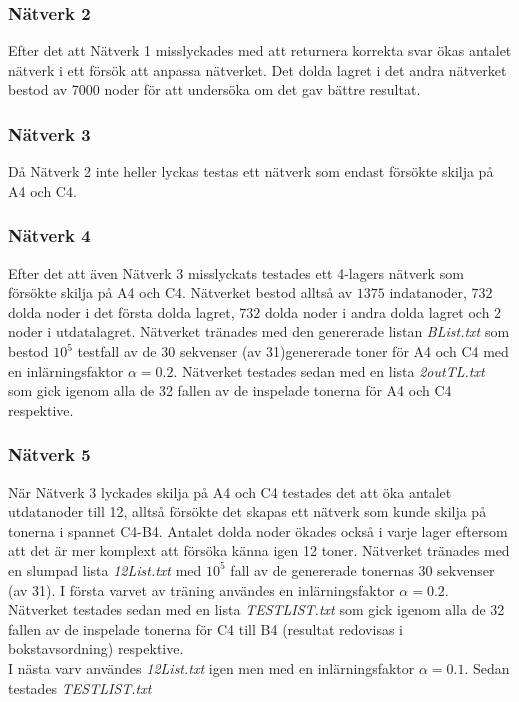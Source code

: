 \documentclass[a4paper,10pt]{article}
\begin{document}
\subsubsection{Nätverk 2}
Efter det att Nätverk 1 misslyckades med att returnera korrekta svar ökas antalet nätverk i ett försök att anpassa nätverket. Det dolda lagret i det andra nätverket bestod av 7000 noder för att undersöka om det gav bättre resultat. 
\subsubsection{Nätverk 3}
Då Nätverk 2 inte heller lyckas testas ett nätverk som endast försökte skilja på A4 och C4. 
\subsubsection{Nätverk 4}
Efter det att även Nätverk 3 misslyckats testades ett 4-lagers nätverk som försökte skilja på A4 och C4. Nätverket bestod alltså av $1375$ indatanoder, $732$ dolda noder i det första dolda lagret, $732$ dolda noder i andra dolda lagret och 2 noder i utdatalagret. Nätverket tränades med den genererade listan \emph{BList.txt} som bestod $10^5$ testfall av de 30 sekvenser (av 31)genererade toner för A4 och C4 med en inlärningsfaktor $\alpha=0.2$. Nätverket testades sedan med en lista \emph{2outTL.txt} som gick igenom alla de 32 fallen av de inspelade tonerna för A4 och C4 respektive.
\subsubsection{Nätverk 5}
När Nätverk 3 lyckades skilja på A4 och C4 testades det att öka antalet utdatanoder till 12, alltså försökte det skapas ett nätverk som kunde skilja på tonerna i spannet C4-B4. Antalet dolda noder ökades också i varje lager eftersom att det är mer komplext att försöka känna igen 12 toner. Nätverket tränades med en slumpad lista \emph{12List.txt} med $10^5$ fall av de genererade tonernas 30 sekvenser (av 31). I första varvet av träning användes en inlärningsfaktor $\alpha=0.2$. Nätverket testades sedan med en lista \emph{TESTLIST.txt} som gick igenom alla de 32 fallen av de inspelade tonerna för C4 till B4 (resultat redovisas i bokstavsordning) respektive. \\I nästa varv användes \emph{12List.txt} igen men med en inlärningsfaktor $\alpha=0.1$. Sedan testades \emph{TESTLIST.txt}


\end{document}
